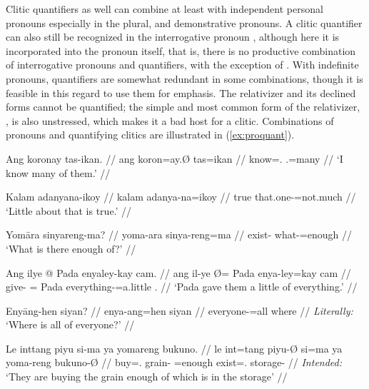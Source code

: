 \xe

Clitic quantifiers as well can combine at least with independent personal
pronouns especially in the plural, and demonstrative pronouns. A clitic
quantifier can also still be recognized in the interrogative pronoun 
, although here it is incorporated into the
pronoun itself, that is, there is no productive combination of interrogative
pronouns and quantifiers, with the exception of . With
indefinite pronouns, quantifiers are somewhat redundant in some combinations,
though it is feasible in this regard to use them for emphasis. The relativizer
 and its declined forms cannot be quantified; the simple and most
common form of the relativizer, , is also unstressed, which makes
it a bad host for a clitic. Combinations of pronouns and quantifying clitics
are illustrated in (\ref{ex:proquant}).

\pex\label{ex:proquant}
\a\label{ex:proquant_perspro}\begingl
	\gla Ang koronay tas-ikan. //
	\glb ang koron=ay.Ø tas=ikan //
	\glc \AgtT{} know=\Fsg{}.\Top{} \TplM{}.\Parg{}=many //
	\glft `I know many of them.' //
\endgl

\a\label{ex:proquant_dempro}\begingl
	\gla Kalam adanyana-ikoy //
	\glb kalam adanya-na=ikoy //
	\glc true that.one-\Gen{}=not.much //
	\glft `Little about that is true.' //
\endgl

\a\label{ex:proquant_interpro}\begingl
	\gla Yomāra sinyareng-ma? //
	\glb yoma-ara sinya-reng=ma //
	\glc exist-\TsgI{} what-\AargI{}=enough //
	\glft `What is there enough of?' //
\endgl

\a\label{ex:proquant_indefpro_1}\begingl
	\gla Ang ilye {} @ Pada enyaley-kay cam. //
	\glb ang il-ye Ø= Pada enya-ley=kay cam //
	\glc \Aarg{} give-\TsgF{} \Top{}= Pada everything-\PargI{}=a.little 
		\TplM{}.\Dat{} //
	\glft `Pada gave them a little of everything.' //
\endgl

\a\label{ex:proquant_indefpro_2}\begingl
	\gla Enyāng-hen siyan? //
	\glb enya-ang=hen siyan //
	\glc everyone-\Aarg{}=all where //
	\glft \textit{Literally:} `Where is all of everyone?' //
\endgl

\a\label{ex:proquant_relpro}\ljudge*\begingl
	\gla Le inttang piyu si-ma ya yomareng bukuno. //
	\glb le int=tang piyu-Ø si=ma ya yoma-reng bukuno-Ø //
	\glc \PargI{} buy=\TplM{}.\Aarg{} grain-\Top{} \Rel{}=enough \LocT{}
	exist=\TsgI{}.\Aarg{} storage-\Top{} //
	\glft \textit{Intended:} `They are buying the grain enough of which is 
		in the storage' //
\endgl

